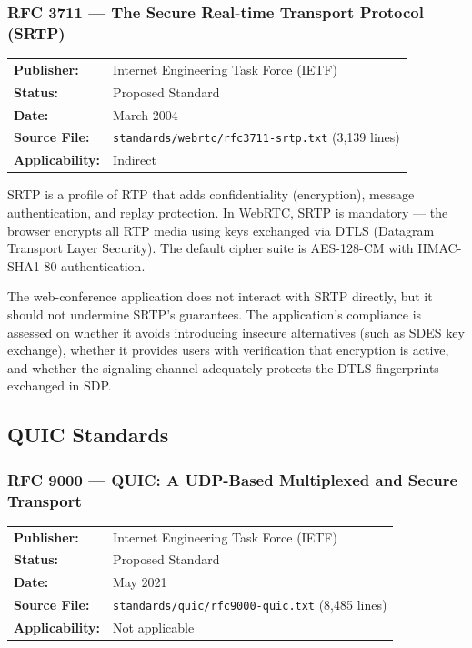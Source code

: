 \documentclass[11pt,letterpaper]{article}
\begin{document}
\subsubsection{RFC 3711 --- The Secure Real-time Transport Protocol (SRTP)}
\label{app:rfc3711}

\begin{tabular}{ll}
\textbf{Publisher:} & Internet Engineering Task Force (IETF) \\
\textbf{Status:} & Proposed Standard \\
\textbf{Date:} & March 2004 \\
\textbf{Source File:} & \texttt{standards/webrtc/rfc3711-srtp.txt} (3,139 lines) \\
\textbf{Applicability:} & Indirect \\
\end{tabular}

\vspace{0.5em}
SRTP is a profile of RTP that adds confidentiality (encryption), message authentication, and replay protection. In WebRTC, SRTP is mandatory --- the browser encrypts all RTP media using keys exchanged via DTLS (Datagram Transport Layer Security). The default cipher suite is AES-128-CM with HMAC-SHA1-80 authentication.

The web-conference application does not interact with SRTP directly, but it should not undermine SRTP's guarantees. The application's compliance is assessed on whether it avoids introducing insecure alternatives (such as SDES key exchange), whether it provides users with verification that encryption is active, and whether the signaling channel adequately protects the DTLS fingerprints exchanged in SDP.

\subsection{QUIC Standards}
\label{app:quic-standards}

\subsubsection{RFC 9000 --- QUIC: A UDP-Based Multiplexed and Secure Transport}
\label{app:rfc9000}

\begin{tabular}{ll}
\textbf{Publisher:} & Internet Engineering Task Force (IETF) \\
\textbf{Status:} & Proposed Standard \\
\textbf{Date:} & May 2021 \\
\textbf{Source File:} & \texttt{standards/quic/rfc9000-quic.txt} (8,485 lines) \\
\textbf{Applicability:} & Not applicable \\
\end{tabular}
\end{document}
